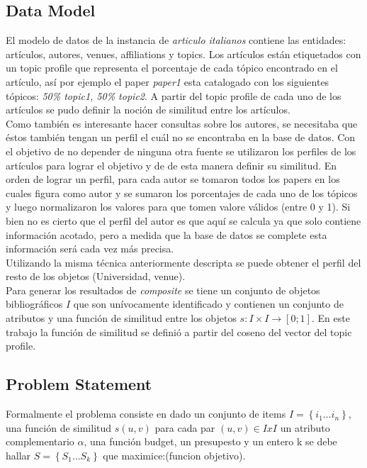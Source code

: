 \subsection{Data Model}\label{body-data-model}
El modelo de datos de la instancia de \textit{articulo italianos} contiene las entidades: artículos, autores, venues, affiliations y topics. Los artículos están etiquetados con un topic profile que representa el porcentaje de cada tópico encontrado en el artículo, así por ejemplo el paper \textit{paper1} esta catalogado con los siguientes tópicos: \textit{50\% topic1, 50\% topic2}. A partir del topic profile de cada uno de los artículos se pudo definir la noción de similitud entre los artículos.\\
Como también es interesante hacer consultas sobre los autores, se necesitaba que éstos también tengan un perfil el cuál no se encontraba en la base de datos. Con el objetivo de no depender de ninguna otra fuente se utilizaron los perfiles de los artículos para lograr el objetivo y de de esta manera definir su similitud. En orden de lograr un perfil, para cada autor se tomaron todos los papers en los cuales figura como autor y se sumaron los porcentajes de cada uno de los tópicos y luego normalizaron los valores para que tomen valore válidos (entre 0 y 1). Si bien no es cierto que el perfil del autor es que aquí se calcula ya que solo contiene información acotado, pero a medida que la base de datos se complete esta información será cada vez más precisa.\\
Utilizando la misma técnica anteriormente descripta se puede obtener el perfil del resto de los objetos (Universidad, venue).\\
Para generar los resultados de \textit{composite} se tiene un conjunto de objetos bibliográficos $I$ que son unívocamente identificado y contienen un conjunto de atributos y una función de similitud entre los objetos $ s: I \times I \rightarrow [0;1]$. En este trabajo la función de similitud se definió a partir del coseno del vector del topic profile.\\
\subsection{Problem Statement}
Formalmente el problema consiste en dado un conjunto de items $ I=\left\{i_1 \ldots i_n\right\} $, una función de similitud $ s(u,v) $ para cada par $ (u,v) \in IxI $ un atributo complementario $\alpha$, una función budget, un presupesto y un entero k se debe hallar $ S=\left\{S_1 \ldots S_k\right\} $ que maximice:(funcion objetivo).

